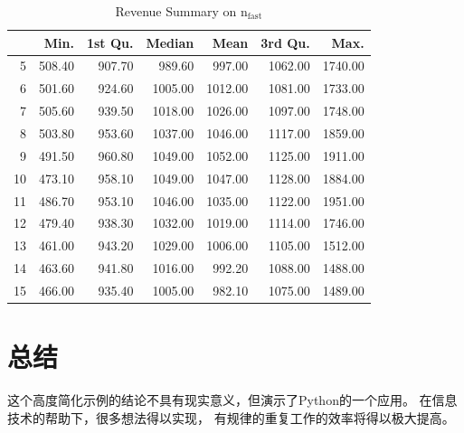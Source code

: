 \documentclass{article}
\begin{document}
\begin{table}[H]
\caption{Revenue Summary on $\mathrm{n_{fast}}$}
\label{tab:revenue-by-nfast}
\begin{center}
\begin{tabular}{rrrrrrr}
  \hline
 & Min. & 1st Qu. & Median & Mean & 3rd Qu. & Max. \\ 
  \hline
5 & 508.40 & 907.70 & 989.60 & 997.00 & 1062.00 & 1740.00 \\ 
  6 & 501.60 & 924.60 & 1005.00 & 1012.00 & 1081.00 & 1733.00 \\ 
  7 & 505.60 & 939.50 & 1018.00 & 1026.00 & 1097.00 & 1748.00 \\ 
  8 & 503.80 & 953.60 & 1037.00 & 1046.00 & 1117.00 & 1859.00 \\ 
  9 & 491.50 & 960.80 & 1049.00 & 1052.00 & 1125.00 & 1911.00 \\ 
  10 & 473.10 & 958.10 & 1049.00 & 1047.00 & 1128.00 & 1884.00 \\ 
  11 & 486.70 & 953.10 & 1046.00 & 1035.00 & 1122.00 & 1951.00 \\ 
  12 & 479.40 & 938.30 & 1032.00 & 1019.00 & 1114.00 & 1746.00 \\ 
  13 & 461.00 & 943.20 & 1029.00 & 1006.00 & 1105.00 & 1512.00 \\ 
  14 & 463.60 & 941.80 & 1016.00 & 992.20 & 1088.00 & 1488.00 \\ 
  15 & 466.00 & 935.40 & 1005.00 & 982.10 & 1075.00 & 1489.00 \\ 
   \hline
\end{tabular}

\end{center}
\end{table}

\section{总结}

这个高度简化示例的结论不具有现实意义，但演示了Python的一个应用。
在信息技术的帮助下，很多想法得以实现，
有规律的重复工作的效率将得以极大提高。
\end{document}
